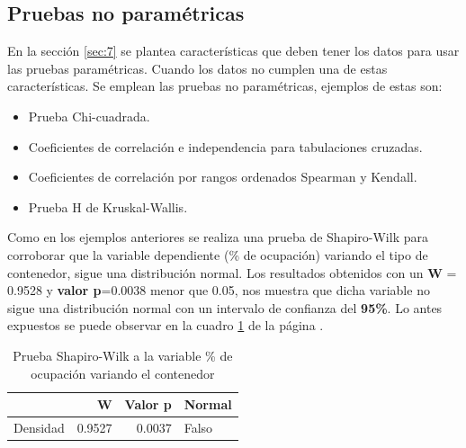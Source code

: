\documentclass{article}
\begin{document}
\begin{table}
  \centering
  \caption{Prueba Shapiro-Wilk a la variable \% de ocupación}
  \label{tab:3}%
\end{table}%

\subsection{Pruebas no paramétricas}
\label{sec:8}
En la sección \ref{sec:7} se plantea características que deben tener los datos para usar las pruebas paramétricas. Cuando los datos no cumplen una de estas características. Se emplean las pruebas no paramétricas, ejemplos de estas son:
\begin{itemize}
    \item Prueba Chi-cuadrada.
    \item Coeficientes de correlación e independencia para tabulaciones cruzadas.
    \item Coeficientes de correlación por rangos ordenados Spearman y Kendall.
    \item Prueba  H  de  Kruskal-Wallis.  
\end{itemize}

Como en los ejemplos anteriores se realiza una prueba de Shapiro-Wilk para corroborar que la variable dependiente (\% de ocupación) variando el tipo de contenedor, sigue una distribución normal. Los resultados obtenidos con un \textbf{W} = 0.9528 y \textbf{valor p}=0.0038 menor que 0.05, nos muestra que dicha variable no sigue una distribución normal con un intervalo de confianza del \textbf{95\%}. Lo antes expuestos se puede observar en la cuadro \ref{tab:4} de la página \pageref{tab:4}.

\begin{table}
  \centering
  \caption{Prueba Shapiro-Wilk a la variable \% de ocupación variando el contenedor}
    \begin{tabular}{lrrl}
    \toprule
          & \textbf{W} & \textbf{Valor p} & \textbf{Normal} \\
    \midrule
    Densidad & 0.9527 & 0.0037& Falso  \\
    \bottomrule
    \end{tabular}%
  \label{tab:4}%
\end{table}%
\end{document}
